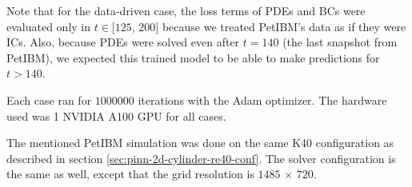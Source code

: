 Note that for the data-driven case, the loss terms of PDEs and BCs were evaluated only in $t\in[125$, $200]$ because we treated PetIBM's data as if they were ICs.
Also, because PDEs were solved even after $t=140$ (the last snapshot from PetIBM), we expected this trained model to be able to make predictions for $t>140$.

Each case ran for $\num{1000000}$ iterations with the Adam optimizer.
The hardware used was 1 NVIDIA A100 GPU for all cases.

The mentioned PetIBM simulation was done on the same K40 configuration as described in section \ref{sec:pinn-2d-cylinder-re40-conf}.
The solver configuration is the same as well, except that the grid resolution is $1485$ $\times$ $720$.
